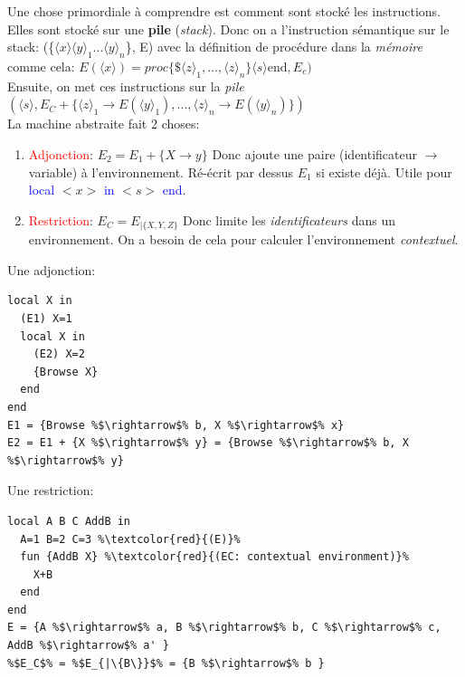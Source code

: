\documentclass{report}
\begin{document}
Une chose primordiale à comprendre est comment sont stocké les instructions. Elles sont stocké sur une \textbf{pile} (\textit{stack}). Donc on a l'instruction sémantique sur le stack: (\{$\langle x \rangle \langle y \rangle_1 ... \langle y \rangle_n$\}, E) avec la définition de procédure dans la \textit{mémoire} comme cela: $E(\langle x \rangle) = proc\{\$ \langle z \rangle_1, ..., \langle z \rangle_n\} \langle s \rangle \text{end}, E_c)$ \\
Ensuite, on met ces instructions sur la \textit{pile} $(\langle s \rangle , E_C + \{\langle z \rangle_1 \rightarrow E(\langle y \rangle_1), ..., \langle z \rangle_n \rightarrow E(\langle y \rangle_n)\})$\\

La machine abstraite fait 2 choses:
\begin{enumerate}
\item \textcolor{red}{Adjonction}: $E_2 = E_1+\{X \rightarrow y\}$ Donc ajoute une paire (identificateur $\rightarrow$ variable) à l'environnement. Ré-écrit par dessus $E_1$ si existe déjà. Utile pour \textcolor{blue}{local} $<x>$ \textcolor{blue}{in} $<s>$ \textcolor{blue}{end}.
\item \textcolor{red}{Restriction}: $E_C = E_{|\{X,Y,Z\}}$ Donc limite les \textit{identificateurs} dans un environnement. On a besoin de cela pour calculer l'environnement \textit{contextuel}.
\end{enumerate}
Une adjonction:
\begin{lstlisting}[escapechar=\%]
local X in
  (E1) X=1 
  local X in 
    (E2) X=2 
    {Browse X}
  end 
end
E1 = {Browse %$\rightarrow$% b, X %$\rightarrow$% x}
E2 = E1 + {X %$\rightarrow$% y} = {Browse %$\rightarrow$% b, X %$\rightarrow$% y}
\end{lstlisting}
Une restriction:
\begin{lstlisting}[escapechar=\%]
local A B C AddB in
  A=1 B=2 C=3 %\textcolor{red}{(E)}%
  fun {AddB X} %\textcolor{red}{(EC: contextual environment)}%
    X+B
  end
end
E = {A %$\rightarrow$% a, B %$\rightarrow$% b, C %$\rightarrow$% c, AddB %$\rightarrow$% a' }
%$E_C$% = %$E_{|\{B\}}$% = {B %$\rightarrow$% b }
\end{lstlisting}
\end{document}
